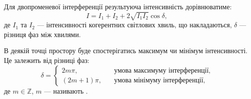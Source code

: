 %	


%
%
%
%
%


Для двопроменевої інтерференції результуюча інтенсивність дорівнюватиме:
\begin{equation}\label{eq:Intens2}
	I = I_1 + I_2 + 2\sqrt{I_1I_2}\cos\delta,
\end{equation}
де $I_1$ та $I_2$ --- інтенсивності когерентних світлових хвиль, що накладаються, $ \delta $ --- різниця фаз між хвилями.

В деякій точці простору буде спостерігатись максимум чи мінімум інтенсивності. Це залежить від різниці фаз:
\begin{equation}\label{eq:InterferenceCondition}
	\delta=
	\begin{cases}
		2 m \pi,                    & \quad \text{умова максимуму інтерференції}, \\
		\left( 2m + 1 \right) \pi , & \quad\text{умова мінімуму інтерференції},
	\end{cases}
\end{equation}
де $m \in \mathbb{Z}$, $ m $ --- називають .


